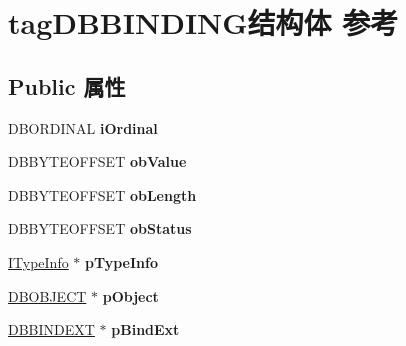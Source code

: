 \hypertarget{structtag_d_b_b_i_n_d_i_n_g}{}\section{tag\+D\+B\+B\+I\+N\+D\+I\+N\+G结构体 参考}
\label{structtag_d_b_b_i_n_d_i_n_g}
\subsection*{Public 属性}
\begin{DoxyCompactItemize}
\item 
\mbox{\label{structtag_d_b_b_i_n_d_i_n_g_ada0bbeeab70084ccac5b72104866d5ec}} 
D\+B\+O\+R\+D\+I\+N\+AL {\bfseries i\+Ordinal}
\item 
\mbox{\label{structtag_d_b_b_i_n_d_i_n_g_a235f95a2caceeada98ceffd97ccd2d55}} 
D\+B\+B\+Y\+T\+E\+O\+F\+F\+S\+ET {\bfseries ob\+Value}
\item 
\mbox{\label{structtag_d_b_b_i_n_d_i_n_g_aade2da3510c07d3d1a728867aab5ad14}} 
D\+B\+B\+Y\+T\+E\+O\+F\+F\+S\+ET {\bfseries ob\+Length}
\item 
\mbox{\label{structtag_d_b_b_i_n_d_i_n_g_a0ee3867a3262983ae29b4160896499c0}} 
D\+B\+B\+Y\+T\+E\+O\+F\+F\+S\+ET {\bfseries ob\+Status}
\item 
\mbox{\label{structtag_d_b_b_i_n_d_i_n_g_a72807838deb149ec8718dbd8fd325f63}} 
\hyperlink{interface_i_type_info}{I\+Type\+Info} $\ast$ {\bfseries p\+Type\+Info}
\item 
\mbox{\label{structtag_d_b_b_i_n_d_i_n_g_a04abc2f9ba50528576d43421846cb01b}} 
\hyperlink{structtag_d_b_o_b_j_e_c_t}{D\+B\+O\+B\+J\+E\+CT} $\ast$ {\bfseries p\+Object}
\item 
\mbox{\label{structtag_d_b_b_i_n_d_i_n_g_aa7f7e75d7bab1756274f0f1dd216cf7d}} 
\hyperlink{structtag_d_b_b_i_n_d_e_x_t}{D\+B\+B\+I\+N\+D\+E\+XT} $\ast$ {\bfseries p\+Bind\+Ext}
\item 
\mbox{\label{structtag_d_b_b_i_n_d_i_n_g_a24f05154c7f015bada0a45cf47738361}} 

\end{DoxyCompactItemize}

